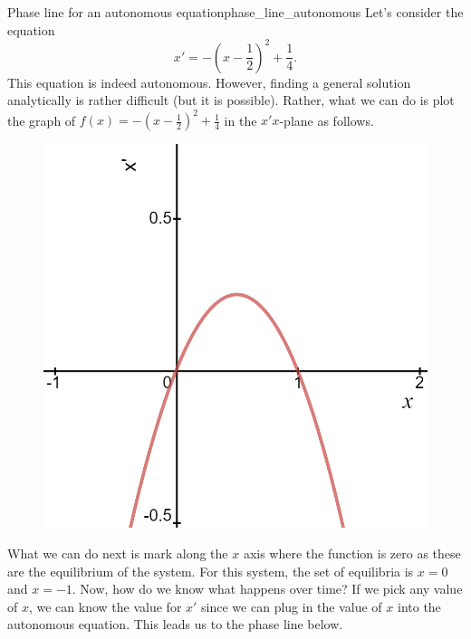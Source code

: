                 \begin{ex}{Phase line for an autonomous equation}{phase_line_autonomous}
                Let's consider the equation
                \[
                x' = -\left(x-\frac{1}{2}\right)^2+\frac{1}{4}.
                \]
                This equation is indeed autonomous. However, finding a general solution analytically is rather difficult (but it is possible).  Rather, what we can do is plot the graph of $f(x)=-\left(x-\frac{1}{2}\right)^2+\frac{1}{4}$ in the $x'x$-plane as follows.
                \begin{figure}[H]
                    \centering
                    \includegraphics[width=.6\textwidth]{Figures_Part_1/for_phase_line.png}
                \end{figure}
                What we can do next is mark along the $x$ axis where the function is zero as these are the equilibrium of the system. For this system, the set of equilibria is $x=0$ and $x=-1$. Now, how do we know what happens over time? If we pick any value of $x$, we can know the value for $x'$ since we can plug in the value of $x$ into the autonomous equation.  This leads us to the phase line below.

                \begin{centering}
                \end{centering}


\end{ex}
